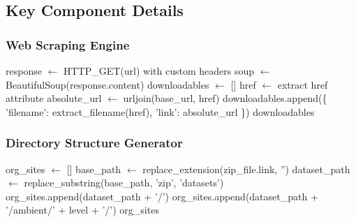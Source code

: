 \documentclass[12pt]{article}
\begin{document}
\subsection{Key Component Details}

\subsubsection{Web Scraping Engine}
\begin{algorithm}[H]
\caption{File Discovery Algorithm}
\begin{algorithmic}[1]
\State response $\gets$ HTTP\_GET(url) with custom headers
\State soup $\gets$ BeautifulSoup(response.content)
\State downloadables $\gets$ []
\State {}
    \State href $\gets$ extract href attribute
    \State {}
        \State absolute\_url $\gets$ urljoin(base\_url, href)
        \State {}
            \State downloadables.append(\{
                \State \quad 'filename': extract\_filename(href),
                \State \quad 'link': absolute\_url
            \State \})
        \EndIf
    \EndIf
\EndFor
\State \Return downloadables
\EndFunction
\end{algorithmic}
\end{algorithm}

\subsubsection{Directory Structure Generator}
\begin{algorithm}[H]
\caption{Site Structure Generation}
\begin{algorithmic}[1]
\State org\_sites $\gets$ []
\State {}
    \State base\_path $\gets$ replace\_extension(zip\_file.link, '')
    \State dataset\_path $\gets$ replace\_substring(base\_path, 'zip', 'datasets')
    \State org\_sites.append(dataset\_path + '/')
    \State {}
        \State org\_sites.append(dataset\_path + '/ambient/' + level + '/')
    \EndFor
\EndFor
\State \Return org\_sites
\EndFunction
\end{algorithmic}
\end{algorithm}
\end{document}
